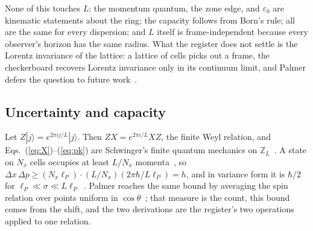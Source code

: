 \documentclass[aps,prd,twocolumn,superscriptaddress,nofootinbib]{revtex4-2}
\begin{document}
None of this touches $L$: the momentum quantum, the zone edge, and $\varepsilon_0$ are kinematic statements about the ring; the capacity follows from Born's rule; all are the same for every dispersion; and $L$ itself is frame-independent because every observer's horizon has the same radius. What the register does not settle is the Lorentz invariance of the lattice: a lattice of cells picks out a frame, the checkerboard recovers Lorentz invariance only in its continuum limit, and Palmer defers the question to future work~\cite{palmer2026c}.

\subsection{Uncertainty and capacity}
\label{sec:capacity}

Let $Z|j\rangle = e^{2\pi ij/L}|j\rangle$. Then $ZX = e^{2\pi i/L}XZ$, the finite Weyl relation, and Eqs.~(\ref{eq:X})--(\ref{eq:pk}) are Schwinger's finite quantum mechanics on $\mathbb{Z}_L$~\cite{weyl1931,schwinger1960,vourdas2004}. A state on $N_x$ cells occupies at least $L/N_x$ momenta~\cite{donoho1989}, so $\Delta x\,\Delta p \ge (N_x\ell_P)\cdot(L/N_x)(2\pi\hbar/L\ell_P) = h$, and in variance form it is $\hbar/2$ for $\ell_P\ll\sigma\ll L\ell_P$~\cite{massar2008}. Palmer reaches the same bound by averaging the spin relation over points uniform in $\cos\theta$~\cite{palmer2026c}; that measure is the count, this bound comes from the shift, and the two derivations are the register's two operations applied to one relation.
\end{document}
